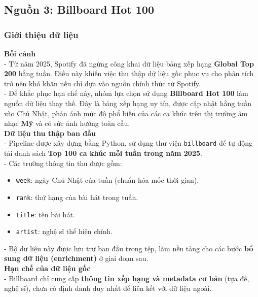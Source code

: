 \subsection{Nguồn 3: Billboard Hot 100}
\subsubsection{Giới thiệu dữ liệu}
    
    \textbf{Bối cảnh} \\
    
    - Từ năm 2025, Spotify đã ngừng công khai dữ liệu bảng xếp hạng \textbf{Global Top 200} hằng tuần. Điều này khiến việc thu thập dữ liệu gốc phục vụ cho phân tích trở nên khó khăn nếu chỉ dựa vào nguồn chính thức từ Spotify. \\
    
    - Để khắc phục hạn chế này, nhóm lựa chọn sử dụng \textbf{Billboard Hot 100} 
    làm nguồn dữ liệu thay thế. Đây là bảng xếp hạng uy tín, được cập nhật hằng tuần vào Chủ Nhật, phản ánh mức độ phổ biến của các ca khúc trên thị trường âm nhạc \textbf{Mỹ} và có sức ảnh hưởng toàn cầu. \\
    
    \textbf{Dữ liệu thu thập ban đầu} \\
    
    - Pipeline được xây dựng bằng Python, sử dụng thư viện \texttt{billboard} để tự động tải danh sách \textbf{Top 100 ca khúc mỗi tuần trong năm 2025}. \\
    
    - Các trường thông tin thu được gồm:
    \begin{itemize}
        \item \texttt{week}: ngày Chủ Nhật của tuần (chuẩn hóa mốc thời gian).
        \item \texttt{rank}: thứ hạng của bài hát trong tuần.
        \item \texttt{title}: tên bài hát.
        \item \texttt{artist}: nghệ sĩ thể hiện chính.
    \end{itemize}
    
    - Bộ dữ liệu này được lưu trữ ban đầu trong tệp, làm nền tảng cho các bước \textbf{bổ sung dữ liệu (enrichment)} ở giai đoạn sau. \\
    
    \textbf{Hạn chế của dữ liệu gốc} \\
    
    - Billboard chỉ cung cấp \textbf{thông tin xếp hạng và metadata cơ bản} (tựa đề, nghệ sĩ), chưa có định danh duy nhất để liên kết với dữ liệu ngoài. \\
    
